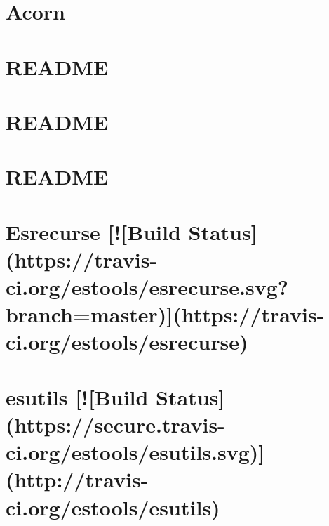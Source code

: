 \documentclass[twoside]{book}
\newcommand{\+}{\discretionary{\mbox{\scriptsize$\hookleftarrow$}}{}{}}
\begin{document}
\chapter{Acorn}
\label{md__c_1_workspace_demo_src_main_script_node_modules_espree_node_modules_acorn__r_e_a_d_m_e}

\chapter{R\+E\+A\+D\+ME}
\label{md__c_1_workspace_demo_src_main_script_node_modules_espree__r_e_a_d_m_e}

\chapter{R\+E\+A\+D\+ME}
\label{md__c_1_workspace_demo_src_main_script_node_modules_esprima__r_e_a_d_m_e}

\chapter{R\+E\+A\+D\+ME}
\label{md__c_1_workspace_demo_src_main_script_node_modules_esquery__r_e_a_d_m_e}

\chapter{Esrecurse \mbox{[}!\mbox{[}Build Status\mbox{]}(https\+://travis-\/ci.org/estools/esrecurse.svg?branch=master)\mbox{]}(https\+://travis-\/ci.org/estools/esrecurse)}
\label{md__c_1_workspace_demo_src_main_script_node_modules_esrecurse__r_e_a_d_m_e}

\chapter{esutils \mbox{[}!\mbox{[}Build Status\mbox{]}(https\+://secure.travis-\/ci.org/estools/esutils.svg)\mbox{]}(http\+://travis-\/ci.org/estools/esutils)}
\label{md__c_1_workspace_demo_src_main_script_node_modules_esutils__r_e_a_d_m_e}

\end{document}

